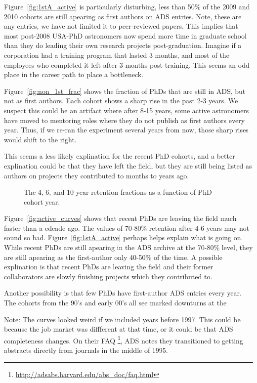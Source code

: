 \documentclass{emulateapj}
\begin{document}
Figure~\ref{fig:1stA_active} is particularly disturbing, less than 50\% of the 2009 and 2010 cohorts are still apearing as first authors on ADS entries. Note, these are any entries, we have not limited it to peer-reviewed papers.  This implies that most post-2008 USA-PhD astronomers now spend more time in graduate school than they do leading their own research projects post-graduation. Imagine if a corporation had a training program that lasted 3 months, and most of the employees who completed it left after 3 months post-training.  This seems an odd place in the career path to place a bottleneck.

Figure~\ref{fig:non_1st_frac} shows the fraction of PhDs that are still in ADS, but not as first authors.  Each cohort shows a sharp rise in the past 2-3 years. We suspect this could be an artifact where after 8-15 years, some active astronomers have moved to mentoring roles where they do not publish as first authors every year.  Thus, if we re-ran the experiment several years from now, those sharp rises would shift to the right.

This seems a less likely explination for the recent PhD cohorts, and a better explination could be that they have left the field, but they are still being listed as authors on projects they contributed to months to years ago.


\begin{figure}
  \caption{The 4, 6, and 10 year retention fractions as a function of PhD cohort year.\label{fig:retention}}
\end{figure}

Figure~\ref{fig:active_curves} shows that recent PhDs are leaving the field much faster than a edcade ago.  The values of 70-80\% retention after 4-6 years may not sound so bad.  Figure~\ref{fig:1stA_active} perhaps helps explain what is going on. While recent PhDs are still apearing in the ADS archive at the 70-80\% level, they are still apearing as the first-author only 40-50\% of the time. A possible explination is that recent PhDs are leaving the field and their former collaborators are slowly finishing projects which they contributed to.

Another possibility is that few PhDs have first-author ADS entries every year. The cohorts from the 90's and early 00's all see marked downturns at the

Note:  The curves looked weird if we included years before 1997. This could be because the job market was diffferent at that time, or it could be that ADS completeness changes. On their FAQ \footnote{\url{http://adsabs.harvard.edu/abs\_doc/faq.html}}, ADS notes they transitioned to getting abstracts directly from journals in the middle of 1995.
\end{document}
